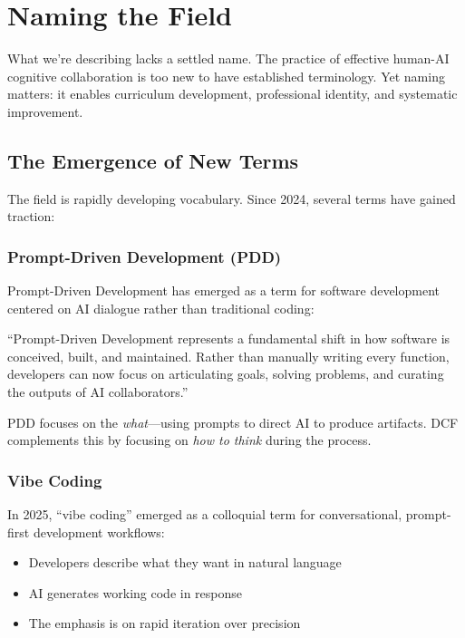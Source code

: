 \chapter{Naming the Field}

What we're describing lacks a settled name. The practice of effective human-AI cognitive collaboration is too new to have established terminology. Yet naming matters: it enables curriculum development, professional identity, and systematic improvement.

\section{The Emergence of New Terms}

The field is rapidly developing vocabulary. Since 2024, several terms have gained traction:

\subsection{Prompt-Driven Development (PDD)}

Prompt-Driven Development has emerged as a term for software development centered on AI dialogue rather than traditional coding:

\begin{quotebox}
``Prompt-Driven Development represents a fundamental shift in how software is conceived, built, and maintained. Rather than manually writing every function, developers can now focus on articulating goals, solving problems, and curating the outputs of AI collaborators.''
\end{quotebox}

PDD focuses on the \emph{what}---using prompts to direct AI to produce artifacts. DCF complements this by focusing on \emph{how to think} during the process.

\subsection{Vibe Coding}

In 2025, ``vibe coding'' emerged as a colloquial term for conversational, prompt-first development workflows:

\begin{itemize}
    \item Developers describe what they want in natural language
    \item AI generates working code in response
    \item The emphasis is on rapid iteration over precision
\end{itemize}


